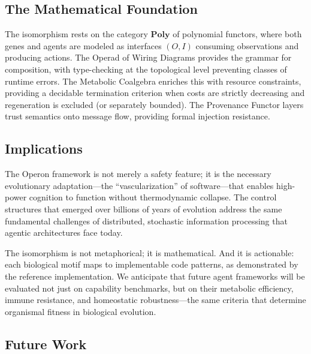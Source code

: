 \subsection*{The Mathematical Foundation}

The isomorphism rests on the category $\mathbf{Poly}$ of polynomial functors, where both genes and agents are
modeled as interfaces $(O, I)$ consuming observations and producing actions. The Operad of Wiring Diagrams
provides the grammar for composition, with type-checking at the topological level preventing classes of
runtime errors. The Metabolic Coalgebra enriches this with resource constraints, providing a decidable
termination criterion when costs are strictly decreasing and regeneration is excluded (or separately bounded).
The Provenance Functor layers trust semantics onto message flow, providing formal injection resistance.

\subsection*{Implications}

The Operon framework is not merely a safety feature; it is the necessary evolutionary adaptation---the
``vascularization'' of software---that enables high-power cognition to function without thermodynamic
collapse. The control structures that emerged over billions of years of evolution address the same fundamental
challenges of distributed, stochastic information processing that agentic architectures face today.

The isomorphism is not metaphorical; it is mathematical. And it is actionable: each biological motif maps
to implementable code patterns, as demonstrated by the reference implementation. We anticipate that future
agent frameworks will be evaluated not just on capability benchmarks, but on their metabolic efficiency,
immune resistance, and homeostatic robustness---the same criteria that determine organismal fitness in
biological evolution.

\subsection*{Future Work}

